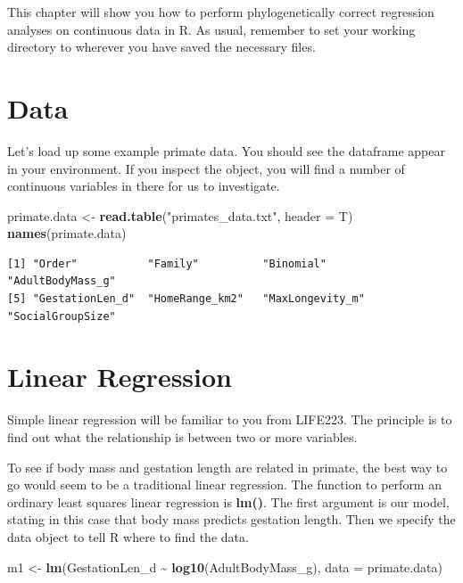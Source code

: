 \documentclass[
]{book}
\newenvironment{Shaded}{\begin{snugshade}}{\end{snugshade}}
\newcommand{\DataTypeTok}[1]{\textcolor[rgb]{0.13,0.29,0.53}{#1}}
\newcommand{\KeywordTok}[1]{\textcolor[rgb]{0.13,0.29,0.53}{\textbf{#1}}}
\newcommand{\NormalTok}[1]{#1}
\newcommand{\OperatorTok}[1]{\textcolor[rgb]{0.81,0.36,0.00}{\textbf{#1}}}
\newcommand{\StringTok}[1]{\textcolor[rgb]{0.31,0.60,0.02}{#1}}
\begin{document}
This chapter will show you how to perform phylogenetically correct regression analyses on continuous data in R. As usual, remember to set your working directory to wherever you have saved the necessary files.

\hypertarget{data-3}{%
\section{Data}\label{data-3}}

Let's load up some example primate data. You should see the dataframe appear in your environment. If you inspect the object, you will find a number of continuous variables in there for us to investigate.

\begin{Shaded}
\begin{Highlighting}[]
\NormalTok{primate.data \textless{}{-}}\StringTok{ }\KeywordTok{read.table}\NormalTok{(}\StringTok{"primates\_data.txt"}\NormalTok{, }\DataTypeTok{header =}\NormalTok{ T)}
\KeywordTok{names}\NormalTok{(primate.data)}
\end{Highlighting}
\end{Shaded}

\begin{verbatim}
[1] "Order"           "Family"          "Binomial"        "AdultBodyMass_g"
[5] "GestationLen_d"  "HomeRange_km2"   "MaxLongevity_m"  "SocialGroupSize"
\end{verbatim}

\hypertarget{linear-regression}{%
\section{Linear Regression}\label{linear-regression}}

Simple linear regression will be familiar to you from LIFE223. The principle is to find out what the relationship is between two or more variables.

To see if body mass and gestation length are related in primate, the best way to go would seem to be a traditional linear regression. The function to perform an ordinary least squares linear regression is \textbf{lm()}. The first argument is our model, stating in this case that body mass predicts gestation length. Then we specify the data object to tell R where to find the data.

\begin{Shaded}
\begin{Highlighting}[]
\NormalTok{m1 \textless{}{-}}\StringTok{ }\KeywordTok{lm}\NormalTok{(GestationLen\_d }\OperatorTok{\textasciitilde{}}\StringTok{ }\KeywordTok{log10}\NormalTok{(AdultBodyMass\_g), }\DataTypeTok{data =}\NormalTok{ primate.data)}
\end{Highlighting}
\end{Shaded}
\end{document}
